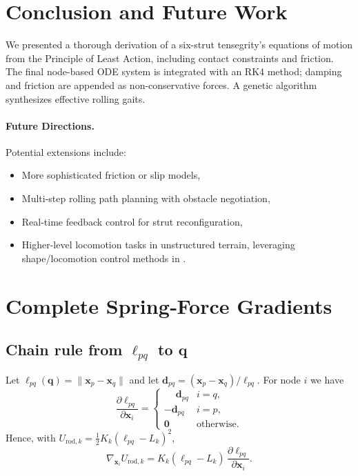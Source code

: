 \documentclass[12pt,letterpaper]{article}
\newcommand{\q}{\bm{q}}
\newcommand{\x}{\bm{x}}
\begin{document}
\section{Conclusion and Future Work}
We presented a thorough derivation of a six-strut tensegrity’s equations of motion from the Principle of Least Action, including contact constraints and friction.  The final node-based ODE system is integrated with an RK4 method; damping and friction are appended as non-conservative forces.  A genetic algorithm synthesizes effective rolling gaits.

\paragraph{Future Directions.}
Potential extensions include:
\begin{itemize}[leftmargin=1.8em]
 \item More sophisticated friction or slip models,
 \item Multi-step rolling path planning with obstacle negotiation,
 \item Real-time feedback control for strut reconfiguration,
 \item Higher-level locomotion tasks in unstructured terrain, leveraging shape/locomotion control methods in \cite{Cai2020}.
\end{itemize}

\appendix
\section{Complete Spring‑Force Gradients}
\label{sec:gradients-complete}

\subsection{Chain rule from \texorpdfstring{$\ell_{pq}$}{ell_pq} to
            \texorpdfstring{$\q$}{q}}

Let $\ell_{pq}(\q)=\bigl\|\x_p-\x_q\bigr\|$ and let
$\bm d_{pq} = (\x_p-\x_q)/\ell_{pq}$.
For node $i$ we have
\[
    \frac{\partial\ell_{pq}}{\partial\x_i}
      = \begin{cases}
         \phantom{-}\bm d_{pq} & i=q, \\
         -\bm d_{pq} & i=p, \\
         \bm 0       & \text{otherwise.}
        \end{cases}
\]
Hence, with $U_{\mathrm{rod},k}=\tfrac12K_k(\ell_{pq}-L_k)^2$,
\[
    \nabla_{\!\x_i}U_{\mathrm{rod},k}
      = K_k(\ell_{pq}-L_k)\,
        \frac{\partial\ell_{pq}}{\partial\x_i}.
\]
\end{document}
